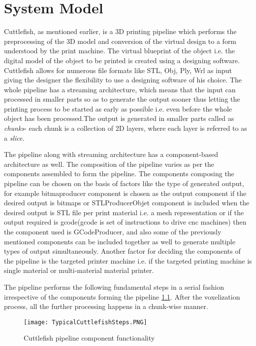 \chapter{System Model}
Cuttlefish, as mentioned earlier, is a 3D printing pipeline which performs the preprocessing of the 3D model and conversion of the virtual design to a form understood by the print machine. The virtual blueprint of the object i.e. the digital model of the object to be printed is created using a designing software. Cuttlefish allows for numerous file formats like STL, Obj, Ply, Wrl as input giving the designer the flexibility to use a designing software of his choice. The whole pipeline has a streaming architecture, which means that the input can processed in smaller parts so as to generate the output sooner thus letting the printing process to be started as early as possible i.e. even before the whole object has been processed.The output is generated in smaller parts called as \textit{chunks}- each chunk is a collection of 2D layers, where each layer is referred to as a \textit{slice}. \newline

The pipeline along with streaming architecture has a component-based architecture as well. The composition of the pipeline varies as per the components assembled to form the pipeline. The components composing the pipeline can be chosen on the basis of factors like the type of generated output, for example bitmaproducer component is chosen as the output component if the desired output is bitmaps or STLProducerObjet component is included when the desired output is STL file per print material i.e. a mesh representation or if the output required is gcode(gcode is set of instructions to drive cnc machines) then the component used is GCodeProducer, and also some of the previously mentioned components can be included together as well to generate multiple types of output simultaneously. Another factor for deciding the components of the pipeline is the targeted printer machine i.e. if the targeted printing machine is single material or multi-material material printer. 
\newline

The pipeline performs the following fundamental steps in a serial fashion irrespective of the components forming the pipeline \ref{fig:TypicalCuttlefishSteps}. After the voxelization process, all the further processing happens in a chunk-wise manner. 

\begin{figure}[ht!]
\texttt{[image: TypicalCuttlefishSteps.PNG]}
\caption{Cuttlefish pipeline component functionality}
\label{fig:TypicalCuttlefishSteps}
\end{figure}

